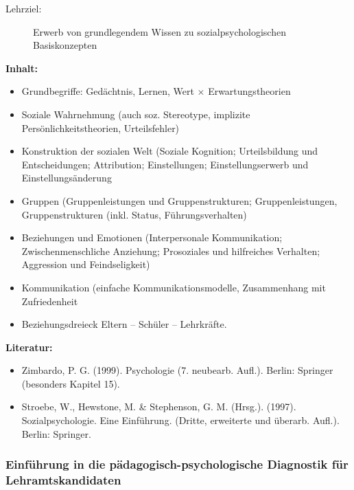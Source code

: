 \documentclass[%
a4paper, %
11pt,               %
leqno,              %
fleqn,              %
]
{scrartcl}
\begin{document}
\begin{description}
  \item[Lehrziel:] Erwerb von grundlegendem Wissen zu sozialpsychologischen
    Basiskonzepten
\end{description}
\textsf{\textbf{Inhalt:}}
\begin{itemize}\itemsep0pt
  \item Grundbegriffe: Gedächtnis, Lernen, Wert $\times$ Erwartungstheorien
  \item Soziale Wahrnehmung (auch soz. Stereotype, implizite
    Persönlichkeitstheorien, Urteilsfehler)
  \item Konstruktion der sozialen Welt (Soziale Kognition; Urteilsbildung
    und Entscheidungen; Attribution; Einstellungen; Einstellungserwerb und
    Einstellungsänderung
  \item Gruppen (Gruppenleistungen und Gruppenstrukturen; Gruppenleistungen,
    Gruppenstrukturen (inkl. Status, Führungsverhalten)
  \item Beziehungen und Emotionen (Interpersonale Kommunikation;
    Zwischenmenschliche Anziehung; Prosoziales und hilfreiches Verhalten;
    Aggression und Feindseligkeit)
  \item Kommunikation (einfache Kommunikationsmodelle, Zusammenhang mit
    Zufriedenheit
  \item Beziehungsdreieck Eltern -- Schüler -- Lehrkräfte.
\end{itemize}
\textsf{\textbf{Literatur:}}
\begin{itemize}\itemsep0pt
  \item Zimbardo, P. G. (1999). Psychologie (7. neubearb. Aufl.). Berlin:
    Springer (besonders Kapitel 15).
  \item Stroebe, W., Hewstone, M. \& Stephenson, G. M. (Hrsg.). (1997).
    Sozialpsychologie. Eine Einführung. (Dritte, erweiterte und überarb. Aufl.).
    Berlin: Springer.
\end{itemize}


\subsubsection{Einführung in die pädagogisch-psychologische Diagnostik für
Lehramtskandidaten} %
\label{ssub:Einführung in die pädagogisch-psychologische Diagnostik für
Lehramtskandidaten}
\end{document}

